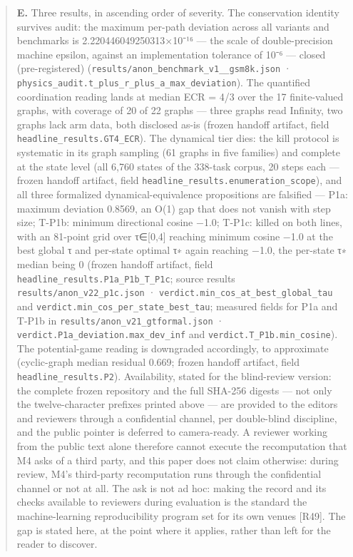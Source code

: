 \documentclass[11pt,a4paper]{article}
\begin{document}
\begin{abstract}
\textbf{E.} Three results, in ascending order of severity. The conservation identity survives audit: the maximum per-path deviation across all variants and benchmarks is 2.220446049250313×10⁻¹⁶ — the scale of double-precision machine epsilon, against an implementation tolerance of 10⁻⁶ — closed (pre-registered) (\texttt{results/\allowbreak anon\_\allowbreak benchmark\_\allowbreak v1\_\_\allowbreak gsm8k.json} · \texttt{physics\_\allowbreak audit.t\_\allowbreak plus\_\allowbreak r\_\allowbreak plus\_\allowbreak a\_\allowbreak max\_\allowbreak deviation}). The quantified coordination reading lands at median ECR = 4/3 over the 17 finite-valued graphs, with coverage of 20 of 22 graphs — three graphs read Infinity, two graphs lack arm data, both disclosed as-is (frozen handoff artifact, field \texttt{headline\_\allowbreak results.GT4\_\allowbreak ECR}). The dynamical tier dies: the kill protocol is systematic in its graph sampling (61 graphs in five families) and complete at the state level (all 6,760 states of the 338-task corpus, 20 steps each — frozen handoff artifact, field \texttt{headline\_\allowbreak results.enumeration\_\allowbreak scope}), and all three formalized dynamical-equivalence propositions are falsified — P1a: maximum deviation 0.8569, an O(1) gap that does not vanish with step size; T-P1b: minimum directional cosine −1.0; T-P1c: killed on both lines, with an 81-point grid over τ∈[0,4] reaching minimum cosine −1.0 at the best global τ and per-state optimal τ∗ again reaching −1.0, the per-state τ∗ median being 0 (frozen handoff artifact, field \texttt{headline\_\allowbreak results.P1a\_\allowbreak P1b\_\allowbreak T\_\allowbreak P1c}; source results \texttt{results/\allowbreak anon\_\allowbreak v22\_\allowbreak p1c.json} · \texttt{verdict.min\_\allowbreak cos\_\allowbreak at\_\allowbreak best\_\allowbreak global\_\allowbreak tau} and \texttt{verdict.min\_\allowbreak cos\_\allowbreak per\_\allowbreak state\_\allowbreak best\_\allowbreak tau}; measured fields for P1a and T-P1b in \texttt{results/\allowbreak anon\_\allowbreak v21\_\allowbreak gtformal.json} · \texttt{verdict.P1a\_\allowbreak deviation.max\_\allowbreak dev\_\allowbreak inf} and \texttt{verdict.T\_\allowbreak P1b.min\_\allowbreak cosine}). The potential-game reading is downgraded accordingly, to approximate (cyclic-graph median residual 0.669; frozen handoff artifact, field \texttt{headline\_\allowbreak results.P2}). Availability, stated for the blind-review version: the complete frozen repository and the full SHA-256 digests — not only the twelve-character prefixes printed above — are provided to the editors and reviewers through a confidential channel, per double-blind discipline, and the public pointer is deferred to camera-ready. A reviewer working from the public text alone therefore cannot execute the recomputation that M4 asks of a third party, and this paper does not claim otherwise: during review, M4's third-party recomputation runs through the confidential channel or not at all. The ask is not ad hoc: making the record and its checks available to reviewers during evaluation is the standard the machine-learning reproducibility program set for its own venues [R49]. The gap is stated here, at the point where it applies, rather than left for the reader to discover. 
\end{abstract}
\end{document}
